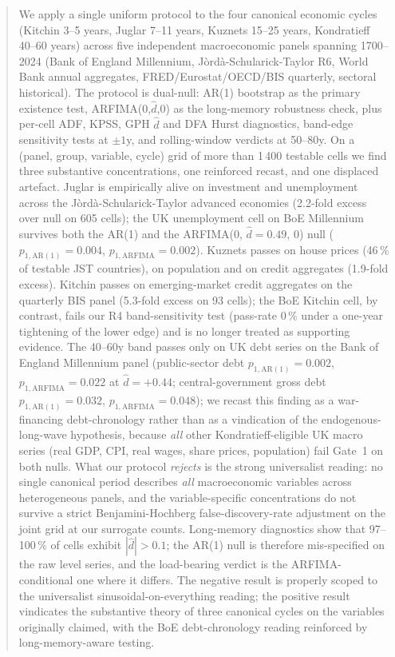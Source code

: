 \begin{abstract}
We apply a single uniform protocol to the four canonical economic
cycles (Kitchin 3--5 years, Juglar 7--11 years, Kuznets 15--25
years, Kondratieff 40--60 years) across five independent
macroeconomic panels spanning 1700--2024
(Bank of England Millennium, J\`ord\`a-Schularick-Taylor R6, World
Bank annual aggregates, FRED/Eurostat/OECD/BIS quarterly, sectoral
historical). The protocol is dual-null: AR(1) bootstrap as the
primary existence test, ARFIMA(0,\(\hat d\),0) as the long-memory
robustness check, plus per-cell ADF, KPSS, GPH \(\hat d\) and DFA
Hurst diagnostics, band-edge sensitivity tests at \(\pm 1\)y, and
rolling-window verdicts at 50--80y. On a (panel, group, variable,
cycle) grid of more than 1\,400 testable cells we find three
substantive concentrations, one reinforced recast, and one
displaced artefact. Juglar is empirically alive on investment
and unemployment across the J\`ord\`a-Schularick-Taylor advanced
economies (2.2-fold excess over null on 605 cells); the UK
unemployment cell on BoE Millennium survives both the AR(1) and
the ARFIMA(0, \(\hat d=0.49\), 0) null
(\(p_{1,\mathrm{AR(1)}}=0.004\),
\(p_{1,\mathrm{ARFIMA}}=0.002\)). Kuznets passes on house prices
(46\,\% of testable JST countries), on population and on credit
aggregates (1.9-fold excess). Kitchin passes on emerging-market
credit aggregates on the quarterly BIS panel (5.3-fold excess on
93 cells); the BoE Kitchin cell, by contrast, fails our R4
band-sensitivity test (pass-rate 0\,\% under a one-year tightening
of the lower edge) and is no longer treated as supporting
evidence. The 40--60y band passes only on UK debt series on the
Bank of England Millennium panel (public-sector debt
\(p_{1,\mathrm{AR(1)}}=0.002\), \(p_{1,\mathrm{ARFIMA}}=0.022\)
at \(\hat d=+0.44\); central-government gross debt
\(p_{1,\mathrm{AR(1)}}=0.032\), \(p_{1,\mathrm{ARFIMA}}=0.048\));
we recast this finding as a \citet{reinhart_rogoff2009}
war-financing debt-chronology rather than as a vindication of
the \citet{kondratieff1925} endogenous-long-wave hypothesis,
because \emph{all} other Kondratieff-eligible UK macro series
(real GDP, CPI, real wages, share prices, population) fail
Gate~1 on both nulls. What our protocol \emph{rejects} is the
strong universalist reading: no single canonical period
describes \emph{all} macroeconomic variables across heterogeneous
panels, and the variable-specific concentrations do not survive
a strict Benjamini-Hochberg false-discovery-rate adjustment on
the joint grid at our surrogate counts. Long-memory diagnostics
show that 97--100\,\% of cells exhibit \(|\hat d|>0.1\); the
AR(1) null is therefore mis-specified on the raw level series,
and the load-bearing verdict is the ARFIMA-conditional one
where it differs. The negative result is properly scoped to the
universalist sinusoidal-on-everything reading; the positive
result vindicates the substantive theory of three canonical
cycles on the variables originally claimed, with the BoE
debt-chronology reading reinforced by long-memory-aware testing.
\end{abstract}
